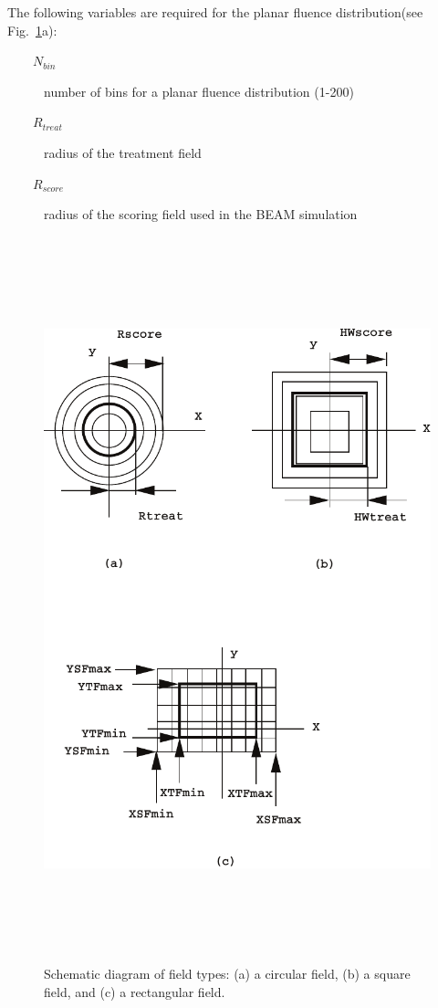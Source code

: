 \documentclass[12pt,twoside]{article}
\begin{document}
The following variables are required for the planar fluence
distribution(see Fig.~\ref{field}a):  \begin{description} \item
[~~~~$N_{bin}$] number of bins for a planar fluence distribution (1-200)
\item [~~~~$R_{treat}$] radius of the treatment field \item
[~~~~$R_{score}$] radius of the scoring field used in the BEAM simulation
\end{description} \begin{figure}[htbp] \begin{center} \leavevmode
\mbox{}
\hspace{0cm}
\includegraphics[height=21cm]{figures/field}
\caption[]
{Schematic diagram of field types: (a) a circular field, (b) a square
field, and (c) a rectangular field. } \label{field} \end{center}
\end{figure}
\end{document}
